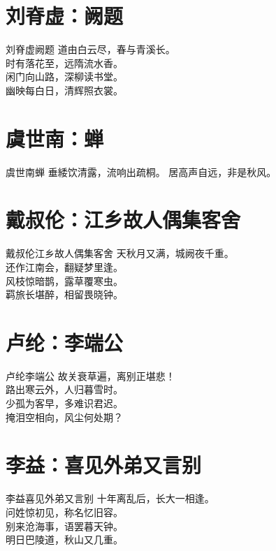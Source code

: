 \documentclass[12pt,oneside,a5paper]{book}
\begin{document}
\chapter{刘脊虚：阙题}
\begin{poemzh}{刘脊虚}{阙题}
道由白云尽，春与青溪长。\\
时有落花至，远隋流水香。\\
闲门向山路，深柳读书堂。\\
幽映每白日，清辉照衣裳。\\ 
\end{poemzh}

\chapter{虞世南：蝉}
\begin{poemzh}{虞世南}{蝉}
垂緌饮清露，流响出疏桐。
居高声自远，非是秋风。
\end{poemzh}

\chapter{戴叔伦：江乡故人偶集客舍}
\begin{poemzh}{戴叔伦}{江乡故人偶集客舍}
天秋月又满，城阙夜千重。\\
还作江南会，翻疑梦里逢。\\
风枝惊暗鹊，露草覆寒虫。\\
羁旅长堪醉，相留畏晓钟。\\ 
\end{poemzh}

\chapter{卢纶：李端公}
\begin{poemzh}{卢纶}{李端公}
故关衰草遍，离别正堪悲！\\
路出寒云外，人归暮雪时。\\
少孤为客早，多难识君迟。\\
掩泪空相向，风尘何处期？\\ 
\end{poemzh}

\chapter{李益：喜见外弟又言别}
\begin{poemzh}{李益}{喜见外弟又言别}
十年离乱后，长大一相逢。\\
问姓惊初见，称名忆旧容。\\
别来沧海事，语罢暮天钟。\\
明日巴陵道，秋山又几重。\\ 
\end{poemzh}
\end{document}
